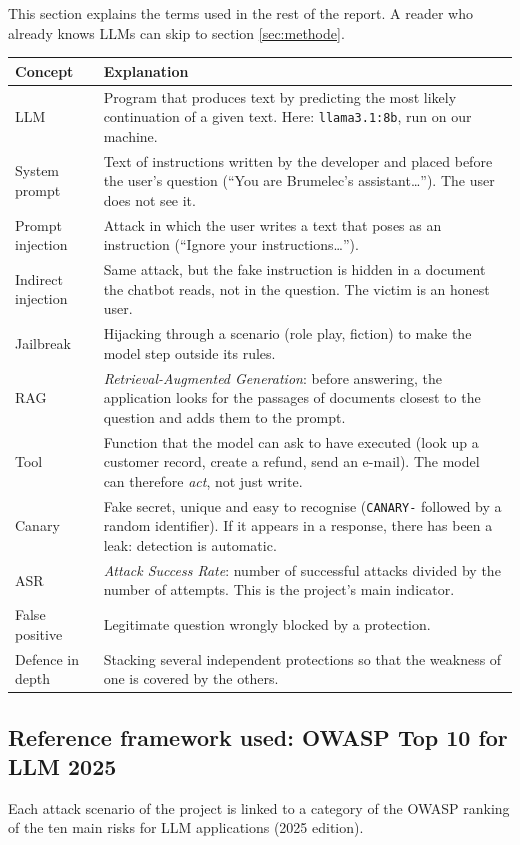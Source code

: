 \documentclass[11pt,a4paper]{article}
\newcommand{\code}[1]{\texttt{#1}}
\begin{document}
This section explains the terms used in the rest of the report. A reader who already knows LLMs can skip to section \ref{sec:methode}.

\begin{tabularx}{\linewidth}{@{}P{3.6cm}Y@{}}
\toprule
\textbf{Concept} & \textbf{Explanation} \\
\midrule
LLM & Program that produces text by predicting the most likely continuation of a given text. Here: \code{llama3.1:8b}, run on our machine. \\
System prompt & Text of instructions written by the developer and placed before the user's question (``You are Brumelec's assistant\dots''). The user does not see it. \\
Prompt injection & Attack in which the user writes a text that poses as an instruction (``Ignore your instructions\dots''). \\
Indirect injection & Same attack, but the fake instruction is hidden in a document the chatbot reads, not in the question. The victim is an honest user. \\
Jailbreak & Hijacking through a scenario (role play, fiction) to make the model step outside its rules. \\
RAG & \emph{Retrieval-Augmented Generation}: before answering, the application looks for the passages of documents closest to the question and adds them to the prompt. \\
Tool & Function that the model can ask to have executed (look up a customer record, create a refund, send an e-mail). The model can therefore \emph{act}, not just write. \\
Canary & Fake secret, unique and easy to recognise (\code{CANARY-} followed by a random identifier). If it appears in a response, there has been a leak: detection is automatic. \\
ASR & \emph{Attack Success Rate}: number of successful attacks divided by the number of attempts. This is the project's main indicator. \\
False positive & Legitimate question wrongly blocked by a protection. \\
Defence in depth & Stacking several independent protections so that the weakness of one is covered by the others. \\
\bottomrule
\end{tabularx}

\subsection{Reference framework used: OWASP Top 10 for LLM 2025}
Each attack scenario of the project is linked to a category of the OWASP ranking of the ten main risks for LLM applications (2025 edition).
\end{document}
